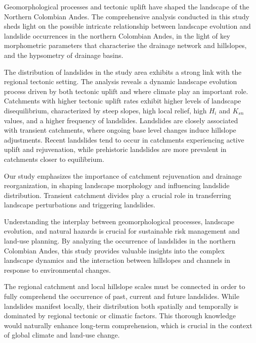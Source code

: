 \documentclass[draft]{agujournal2019}
\begin{document}
\par Geomorphological processes and tectonic uplift have shaped the landscape of the Northern Colombian Andes. The comprehensive analysis conducted in this study sheds light on the possible intricate relationship between landscape evolution and landslide occurrences in the northern Colombian Andes, in the light of key morphometric parameters that characterise the drainage network and hillslopes, and the hypsometry of drainage basins.

\par The distribution of landslides in the study area exhibits a strong link with the regional tectonic setting. The analysis reveals a dynamic landscape evolution process driven by both tectonic uplift and where climate play an important role. Catchments with higher tectonic uplift rates exhibit higher levels of landscape disequilibrium, characterized by steep slopes, high local relief, high $H_i$ and $K_{sn}$ values, and a higher frequency of landslides. Landslides are closely associated with transient catchments, where ongoing base level changes induce hillslope adjustments. Recent landslides tend to occur in catchments experiencing active uplift and rejuvenation, while prehistoric landslides are more prevalent in catchments closer to equilibrium.  

\par Our study emphasizes the importance of catchment rejuvenation and drainage reorganization, in shaping landscape morphology and influencing landslide distribution. Transient catchment divides play a crucial role in transferring landscape perturbations and triggering landslides.  

\par Understanding the interplay between geomorphological processes, landscape evolution, and natural hazards is crucial for sustainable risk management and land-use planning. By analyzing the occurrence of landslides in the northern Colombian Andes, this study provides valuable insights into the complex landscape dynamics and the interaction between hillslopes and channels in response to environmental changes. 

\par The regional catchment and local hillslope scales must be connected in order to fully comprehend the occurrence of past, current and future landslides. While landslides manifest locally, their distribution both spatially and temporally is dominated by regional tectonic or climatic factors. This thorough knowledge would naturally enhance long-term comprehension, which is crucial in the context of global climate and land-use change.
\end{document}

